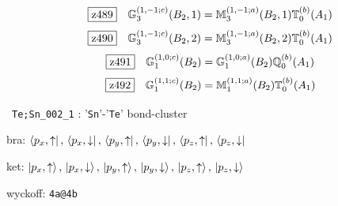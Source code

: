 \documentclass[fleqn,10pt,landscape]{jsarticle}
\begin{document}
\begin{dmath*}
\hspace*{3mm}\fbox{z489}\quad \mathbb{G}_{3}^{(1,-1;c)}(B_{2},1)=\mathbb{M}_{3}^{(1,-1;a)}(B_{2},1) \mathbb{T}_{0}^{(b)}(A_{1})
\end{dmath*}
\begin{dmath*}
\hspace*{3mm}\fbox{z490}\quad \mathbb{G}_{3}^{(1,-1;c)}(B_{2},2)=\mathbb{M}_{3}^{(1,-1;a)}(B_{2},2) \mathbb{T}_{0}^{(b)}(A_{1})
\end{dmath*}
\begin{dmath*}
\hspace*{3mm}\fbox{z491}\quad \mathbb{G}_{1}^{(1,0;c)}(B_{2})=\mathbb{G}_{1}^{(1,0;a)}(B_{2}) \mathbb{Q}_{0}^{(b)}(A_{1})
\end{dmath*}
\begin{dmath*}
\hspace*{3mm}\fbox{z492}\quad \mathbb{G}_{1}^{(1,1;c)}(B_{2})=\mathbb{M}_{1}^{(1,1;a)}(B_{2}) \mathbb{T}_{0}^{(b)}(A_{1})
\end{dmath*}
\vspace{5mm}

\noindent\textbullet\, \texttt{Te;Sn_002_1} : '\texttt{Sn}'-'\texttt{Te}' bond-cluster

\noindent\quad * bra: $\bra{p_{x},\uparrow},\, \bra{p_{x},\downarrow},\, \bra{p_{y},\uparrow},\, \bra{p_{y},\downarrow},\, \bra{p_{z},\uparrow},\, \bra{p_{z},\downarrow}$

\noindent\quad * ket: $\ket{p_{x},\uparrow},\, \ket{p_{x},\downarrow},\, \ket{p_{y},\uparrow},\, \ket{p_{y},\downarrow},\, \ket{p_{z},\uparrow},\, \ket{p_{z},\downarrow}$

\noindent\quad * wyckoff: \texttt{4a@4b}
\end{document}

